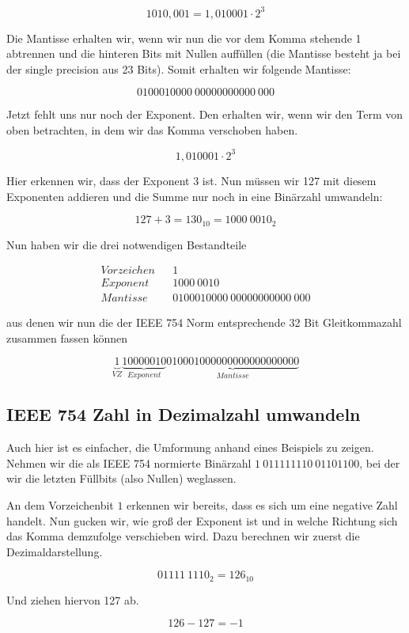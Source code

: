 $$1010,001 = 1,010001 \cdot 2^{3}$$

Die Mantisse erhalten wir, wenn wir nun die vor dem Komma stehende 1 abtrennen und die hinteren Bits mit Nullen auffüllen (die Mantisse besteht ja bei der single precision aus 23 Bits). Somit erhalten wir folgende Mantisse:

$$0100010000\ 00000000000\ 000$$

Jetzt fehlt uns nur noch der Exponent. Den erhalten wir, wenn wir den Term von oben betrachten, in dem wir das Komma verschoben haben.

$$ 1,010001 \cdot 2^{3}$$

Hier erkennen wir, dass der Exponent $3$ ist. Nun müssen wir 127 mit diesem Exponenten addieren und die Summe nur noch in eine Binärzahl umwandeln:

$$127 + 3 = 130_{10} = 1000\ 0010_{2}$$

Nun haben wir die drei notwendigen Bestandteile

\begin{eqnarray}
Vorzeichen & & 1 \\
Exponent & & 1000\ 0010\\
Mantisse & & 0100010000\ 00000000000\ 000
\end{eqnarray}

aus denen wir nun die der IEEE 754 Norm entsprechende 32 Bit Gleitkommazahl zusammen fassen können

$$\underbrace{1}_{VZ}\underbrace{10000010}_{Exponent}\underbrace{010001000000000000000000}_{Mantisse}$$

\subsection{IEEE 754 Zahl in Dezimalzahl umwandeln}

Auch hier ist es einfacher, die Umformung anhand eines Beispiels zu zeigen. Nehmen wir die als IEEE 754 normierte Binärzahl $1\ 011111110\ 01101100$, bei der wir die letzten Füllbits (also Nullen) weglassen.

An dem Vorzeichenbit $1$ erkennen wir bereits, dass es sich um eine negative Zahl handelt. Nun gucken wir, wie groß der Exponent ist und in welche Richtung sich das Komma demzufolge verschieben wird. Dazu berechnen wir zuerst die Dezimaldarstellung.

$$01111\ 1110_{2} = 126_{10}$$

Und ziehen hiervon 127 ab.

$$126 - 127 = -1$$

